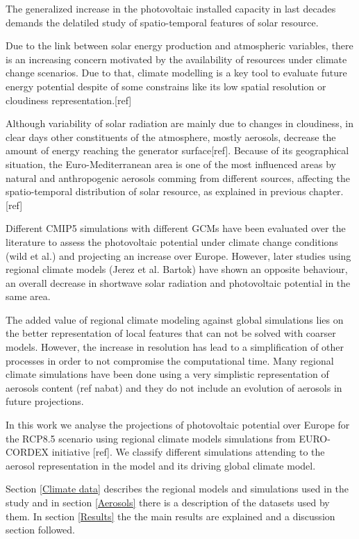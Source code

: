     The generalized increase in the photovoltaic installed capacity in last decades demands the delatiled study of spatio-temporal features of solar resource.

  Due to the link between solar energy production and atmospheric variables, there is an increasing concern motivated by the availability of resources under climate change scenarios. Due to that, climate modelling is a key tool to evaluate future energy potential despite of some constrains like its low spatial resolution or cloudiness representation.[ref]
  
   Although variability of solar radiation are mainly due to changes in cloudiness, in clear days other constituents of the atmosphere, mostly aerosols, decrease the amount of energy reaching the generator surface[ref]. Because of its geographical situation, the Euro-Mediterranean area is one of the most influenced areas by natural and anthropogenic aerosols comming from different sources, affecting the spatio-temporal distribution of solar resource, as explained in previous chapter.[ref]

   Different CMIP5 simulations with different GCMs have been evaluated over the literature to assess the photovoltaic potential under climate change conditions (wild et al.) and projecting an increase over Europe. However, later studies using regional climate models (Jerez et al. Bartok) have shown an opposite behaviour, an overall decrease in shortwave solar radiation and photovoltaic potential in the same area.

   The added value of regional climate modeling against global simulations lies on the better representation of local features that can not be solved with coarser models. However, the increase in resolution has lead to a simplification of other processes in order to not compromise the computational time. Many regional climate simulations have been done using a very simplistic representation of aerosols content (ref nabat) and they do not include an evolution of aerosols in future projections.
   
   In this work we analyse the projections of photovoltaic potential over Europe for the RCP8.5 scenario using regional climate models simulations from EURO-CORDEX initiative [ref]. We classify different simulations attending to the aerosol representation in the model and its driving global climate model.\

   Section \ref{Climate data} describes the regional models and simulations used in the study and in section \ref{Aerosols} there is a description of the datasets used by them.  In section \ref{Results} the the main results are explained and a discussion section followed.

